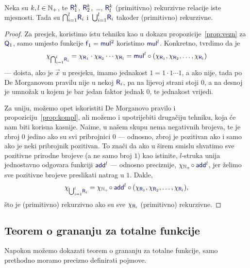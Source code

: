 \begin{propozicija}\label{prop:skupl}
Neka su $k,l\in{\mathbb N}_+$, te $\f R_1^k$, $\f R_2^k$,~\ldots, $\f R_l^k$ (primitivno) rekurzivne relacije iste mjesnosti. Tada su $\bigcap_{i=1}^l\!\f R_i$ i\, $\bigcup_{i=1}^l\!\f R_i$ također (primitivno) rekurzivne.
\end{propozicija}
\begin{proof}
Za presjek, koristimo istu tehniku kao u dokazu propozicije~\ref{prop:vezn} za $\f Q_1$, samo umjesto funkcije $\f f_1=\f{mul}^2$ koristimo $\f{mul}^l$. Konkretno, tvrdimo da je \begin{equation}
    \chi_{\bigcap_{i=1}^l\!\f R_i}=\chi_{\f R_1}\cdot\chi_{\f R_2}\dotsm\chi_{\f R_l}=\f{mul}^l\circ(\chi_{\f R_1},\chi_{\f R_2},\dotsc,\chi_{\f R_l})
\end{equation}
--- doista, ako je $\vec x$ u presjeku, imamo jednakost $1=1\cdot1\dotsm1$, a ako nije, tada po De Morganovom pravilu nije u nekoj $\f{R}_i$, pa na lijevoj strani stoji $0$, a na desnoj je umnožak u kojem je bar jedan faktor jednak $0$, te jednakost vrijedi.

Za uniju, možemo opet iskoristiti De Morganovo pravilo i propoziciju~\ref{prop:kompl}, ali možemo i upotrijebiti drugačiju tehniku, koja će nam biti korisna kasnije. Naime, u našem skupu nema negativnih brojeva, te je zbroj $0$ jedino ako su svi pribrojnici $0$ --- odnosno, zbroj je pozitivan ako i samo ako je neki pribrojnik pozitivan. To znači da ako u širem smislu shvatimo sve pozitivne prirodne brojeve (a ne samo broj $1$) kao istinite, $l$-struka unija jednostavno odgovara funkciji $\f{add}^l$ --- odnosno preciznije, $\chi_{\N_+}\!\circ\f{add}^l$, jer želimo sve pozitivne brojeve preslikati natrag u $1$. Dakle,
\begin{equation}
\label{eq:unk}
    \chi_{\bigcup_{i=1}^l\!\f R_i}=\chi_{\N_+}\!\circ\f{add}^l\circ(\chi_{\f R_1},\chi_{\f R_2},\dotsc,\chi_{\f R_l})\text,
\end{equation}
što je (primitivno) rekurzivno ako su sve $\chi_{\f R_i}$ (primitivno) rekurzivne.
\end{proof}

\subsection{Teorem o grananju za totalne funkcije}

Napokon možemo dokazati teorem o grananju za totalne funkcije, samo prethodno moramo precizno definirati pojmove.

